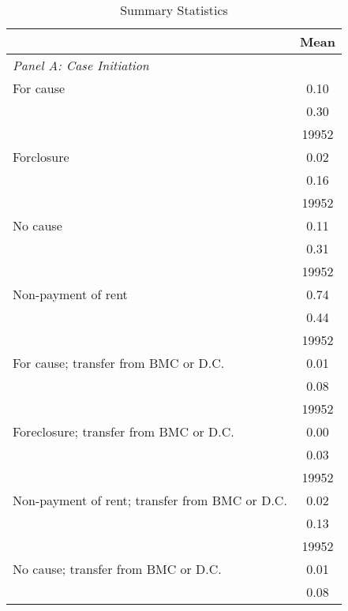 \begin{table}[htbp]\centering
\def\sym#1{\ifmmode^{#1}\else\(^{#1}\)\fi}
\caption{Summary Statistics}
\begin{tabular}{l*{1}{c}}
\toprule
                    &        Mean\\
\midrule
\emph{Panel A: Case Initiation}&            \\
\hspace{0.25cm}For cause&        0.10\\
                    &        0.30\\
                    &       19952\\
\hspace{0.25cm}Forclosure&        0.02\\
                    &        0.16\\
                    &       19952\\
\hspace{0.25cm}No cause&        0.11\\
                    &        0.31\\
                    &       19952\\
\hspace{0.25cm}Non-payment of rent&        0.74\\
                    &        0.44\\
                    &       19952\\
\hspace{0.25cm}For cause; transfer from BMC or D.C.&        0.01\\
                    &        0.08\\
                    &       19952\\
\hspace{0.25cm}Foreclosure; transfer from BMC or D.C.&        0.00\\
                    &        0.03\\
                    &       19952\\
\hspace{0.25cm}Non-payment of rent; transfer from BMC or D.C.&        0.02\\
                    &        0.13\\
                    &       19952\\
\hspace{0.25cm}No cause; transfer from BMC or D.C.&        0.01\\
                    &        0.08\\

\end{tabular}
\end{table}
